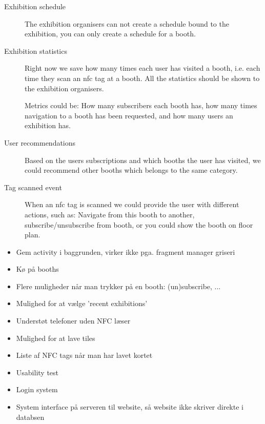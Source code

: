 \begin{description}
\item[Exhibition schedule] The exhibition organisers can not create a schedule bound to the exhibition, you can only create a schedule for a booth.%
\item[Exhibition statistics] Right now we save how many times each user has visited a booth, i.e. each time they scan an \ac{nfc} tag at a booth. All the statistics should be shown to the exhibition organisers.

Metrics could be: How many subscribers each booth has, how many times navigation to a booth has been requested, and how many users an exhibition has.
\item[User recommendations] Based on the users subscriptions and which booths the user has visited, we could recommend other booths which belongs to the same category.
\item[Tag scanned event] When an \ac{nfc} tag is scanned we could provide the user with different actions, such as: Navigate from this booth to another, subscribe/unsubscribe from booth, or you could show the booth on floor plan.
\end{description}

\begin{itemize}
\item Gem activity i baggrunden, virker ikke pga. fragment manager griseri
\item Kø på booths
\item Flere muligheder når man trykker på en booth: (un)subscribe, ...
\item Mulighed for at vælge 'recent exhibitions'
\item Understøt telefoner uden NFC læser
\item Mulighed for at lave tiles
\item Liste af NFC tags når man har lavet kortet
\item Usability test
\item Login system
\item System interface på serveren til website, så website ikke skriver direkte i databsen
\end{itemize}